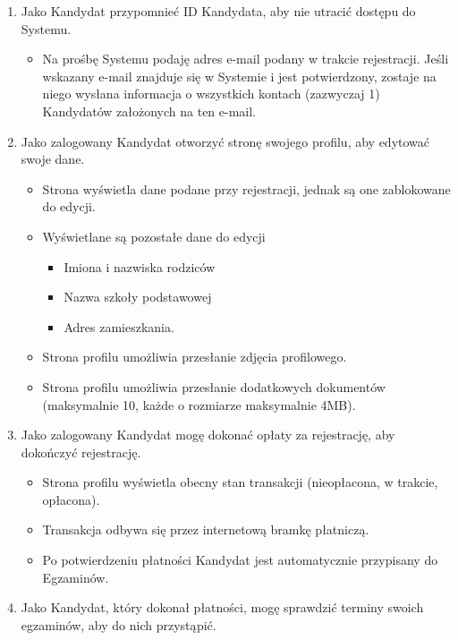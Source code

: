 \documentclass{article}
\begin{document}
\begin{enumerate}
\begin{itemize}
        \end{itemize}
    \item Jako Kandydat przypomnieć ID Kandydata, aby nie utracić dostępu do Systemu. 
        \begin{itemize}
            \item Na prośbę Systemu podaję adres e-mail podany w trakcie rejestracji. Jeśli wskazany e-mail znajduje się w Systemie i jest potwierdzony, zostaje na niego wysłana informacja o wszystkich kontach (zazwyczaj 1) Kandydatów założonych na ten e-mail.
        \end{itemize}
    \item Jako zalogowany Kandydat otworzyć stronę swojego profilu, aby edytować swoje dane.   
        \begin{itemize}
            \item Strona wyświetla dane podane przy rejestracji, jednak są one zablokowane do edycji.
            \item Wyświetlane są pozostałe dane do edycji
                \begin{itemize}
                    \item Imiona i nazwiska rodziców
                    \item Nazwa szkoły podstawowej
                    \item Adres zamieszkania.
                \end{itemize}
            \item Strona profilu umożliwia przesłanie zdjęcia profilowego.
            \item Strona profilu umożliwia przesłanie dodatkowych dokumentów (maksymalnie 10, każde o rozmiarze maksymalnie 4MB).
        \end{itemize}
    \item Jako zalogowany Kandydat mogę dokonać opłaty za rejestrację, aby dokończyć rejestrację.
        \begin{itemize}
            \item Strona profilu wyświetla obecny stan transakcji (nieopłacona, w trakcie, opłacona).
            \item Transakcja odbywa się przez internetową bramkę płatniczą.
            \item Po potwierdzeniu płatności Kandydat jest automatycznie przypisany do Egzaminów.
        \end{itemize}
    \item Jako Kandydat, który dokonał płatności, mogę sprawdzić terminy swoich egzaminów, aby do nich przystąpić.

\end{enumerate}
\end{document}
